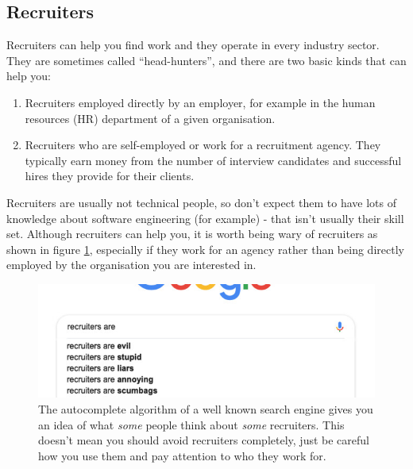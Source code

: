 \documentclass[
]{book}
\providecommand{\tightlist}{%
  \setlength{\itemsep}{0pt}\setlength{\parskip}{0pt}}
\begin{document}
\hypertarget{recruiters}{%
\subsection{Recruiters}\label{recruiters}}

Recruiters can help you find work and they operate in every industry sector. They are sometimes called ``head-hunters'', and there are two basic kinds that can help you:

\begin{enumerate}
\def\labelenumi{\arabic{enumi}.}
\tightlist
\item
  Recruiters employed directly by an employer, for example in the human resources (HR) department of a given organisation.
\item
  Recruiters who are self-employed or work for a recruitment agency. They typically earn money from the number of interview candidates and successful hires they provide for their clients.
\end{enumerate}

Recruiters are usually not technical people, so don't expect them to have lots of knowledge about software engineering (for example) - that isn't usually their skill set. Although recruiters can help you, it is worth being wary of recruiters as shown in figure \ref{fig:recruiter-fig}, especially if they work for an agency rather than being directly employed by the organisation you are interested in.

\begin{figure}

{\centering \includegraphics[width=0.9\linewidth]{images/recruiters-are} 

}

\caption{The autocomplete algorithm of a well known search engine gives you an idea of what \emph{some} people think about \emph{some} recruiters. This doesn't mean you should avoid recruiters completely, just be careful how you use them and pay attention to who they work for.}\label{fig:recruiter-fig}
\end{figure}
\end{document}
